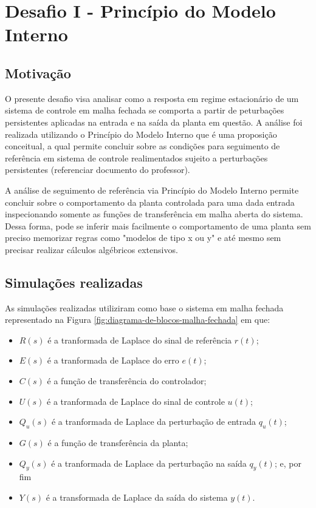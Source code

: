\section{Desafio I - Princípio do Modelo Interno}

\subsection{Motivação}
O presente desafio visa analisar como a resposta em regime estacionário de um
sistema de controle em malha fechada se comporta a partir de peturbações
persistentes aplicadas na entrada e na saída da planta em questão. A análise foi
realizada utilizando o Princípio do Modelo Interno que é uma proposição
conceitual, a qual permite concluir sobre as condições para seguimento de
referência em sistema de controle realimentados sujeito a perturbações
persistentes (referenciar documento do professor).

A análise de seguimento de referência via Princípio do Modelo Interno permite
concluir sobre o comportamento da planta controlada para uma dada entrada
inspecionando somente as funções de transferência em malha aberta do sistema.
Dessa forma, pode se inferir mais facilmente o comportamento de uma planta sem
preciso memorizar regras como "modelos de tipo x ou y" e até mesmo sem precisar
realizar cálculos algébricos extensivos.

\subsection{Simulações realizadas}
\label{sec:simulacao-realizadas}
As simulações realizadas utiliziram como base o sistema em malha fechada
representado na Figura \ref{fig:diagrama-de-blocos-malha-fechada} em que:
\begin{itemize}
    \item $R(s)$ é a tranformada de Laplace do sinal de referência $r(t)$;
    \item $E(s)$ é a tranformada de Laplace do erro $e(t)$;
    \item $C(s)$ é a função de transferência do controlador;
    \item $U(s)$ é a tranformada de Laplace do sinal de controle $u(t)$;
    \item $Q_{u}(s)$ é a tranformada de Laplace da perturbação de entrada
    $q_{u}(t)$;
    \item $G(s)$ é a função de transferência da planta;
    \item $Q_{y}(s)$ é a tranformada de Laplace da perturbação na saída
    $q_{y}(t)$; e, por fim
    \item $Y(s)$ é a transformada de Laplace da saída do sistema $y(t)$.
\end{itemize}

